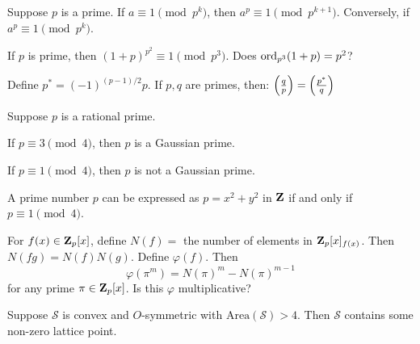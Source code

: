 \documentclass[11pt]{rosspset}
\begin{document}
\podasip

\begin{problem}
    Suppose $p$ is a prime. If $a\equiv 1 \pmod{p^k}$, then $a^p \equiv 1 \pmod{p^{k+1}}$. Conversely, if $a^p \equiv 1\pmod{p^{k}}$.
\end{problem}

\begin{problem}
    If $p$ is prime, then $(1+p)^{p^2}\equiv 1 \pmod{p^3}$. Does $\operatorname{ord}_{p^3}(1+p) = p^2$?
\end{problem}

\begin{problem}
    Define $p^* = (-1)^{(p-1)/2} p$. If $p,q$ are primes, then: $\left(\frac{q}{p}\right) = \left(\frac{p^*}{q}\right)$
\end{problem}

\begin{problem}
    Suppose $p$ is a rational prime.
    \begin{subproblem}
        \item If $p\equiv 3 \pmod 4$, then $p$ is a Gaussian prime.
        \item If $p\equiv 1 \pmod 4$, then $p$ is not a Gaussian prime.
    \end{subproblem}
\end{problem}

\begin{problem}
    A prime number $p$ can be expressed as $p=x^2+y^2$ in $\mathbf{Z}$ if and only if $p\equiv 1 \pmod 4$.
    
\end{problem}

\begin{problem}
    For $f(x) \in \mathbf{Z}_p[x]$, define $N(f) = $ the number of elements in $\mathbf{Z}_p[x]_{f(x)}$. Then $N(fg) = N(f)N(g)$. Define $\varphi(f)$. Then
    \[\varphi(\pi^m) = N(\pi)^m - N(\pi)^{m-1}\]
    for any prime $\pi\in\mathbf{Z}_p[x]$. Is this $\varphi$ multiplicative?
\end{problem}

\begin{problem}
    Suppose $\mathcal S$ is convex and $O$-symmetric with $\mathrm{Area}(\mathcal S)>4$. Then $\mathcal S$ contains some non-zero lattice point.

\end{problem}
\end{document}
